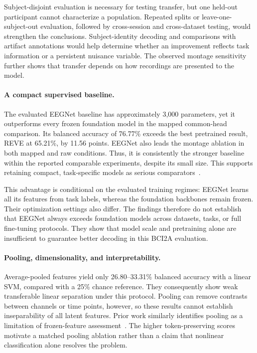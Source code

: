 \documentclass{article}
\begin{document}
Subject-disjoint evaluation is necessary for testing transfer, but one
held-out participant cannot characterize a population. Repeated splits or
leave-one-subject-out evaluation, followed by cross-session and cross-dataset
testing, would strengthen the conclusions. Subject-identity decoding and
comparisons with artifact annotations would help determine whether an
improvement reflects task information or a persistent nuisance variable.
The observed montage sensitivity further shows that transfer depends on
how recordings are presented to the model.

\paragraph{A compact supervised baseline.}
The evaluated EEGNet baseline has approximately 3,000 parameters, yet it
outperforms every frozen foundation model in the mapped common-head
comparison. Its balanced accuracy of 76.77\% exceeds the best pretrained
result, REVE at 65.21\%, by 11.56 points. EEGNet also leads the montage
ablation in both mapped and raw conditions. Thus, it is consistently the
stronger baseline within the reported comparable experiments, despite its
small size. This supports retaining compact, task-specific models as
serious comparators~\cite{lawhern2018eegnet}.

This advantage is conditional on the evaluated training regimes: EEGNet
learns all its features from task labels, whereas the foundation backbones
remain frozen. Their optimization settings also differ. The findings
therefore do not establish that EEGNet always exceeds foundation models
across datasets, tasks, or full fine-tuning protocols. They show that model
scale and pretraining alone are insufficient to guarantee better decoding
in this BCI2A evaluation.

\paragraph{Pooling, dimensionality, and interpretability.}
Average-pooled features yield only 26.80--33.31\% balanced accuracy with a
linear SVM, compared with a 25\% chance reference. They consequently show
weak transferable linear separation under this protocol. Pooling can
remove contrasts between channels or time points, however, so these
results cannot establish inseparability of all latent features. Prior
work similarly identifies pooling as a limitation of frozen-feature
assessment~\cite{sirca2026beyond}. The higher token-preserving scores motivate
a matched pooling ablation rather than a claim that nonlinear classification
alone resolves the problem.
\end{document}
